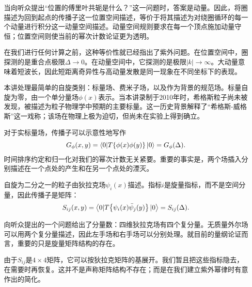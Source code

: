 当向听众提出``位置的傅里叶共轭是什么？''这一问题时，答案是动量。因此，将圈描述为回到起点的传播子这一位置空间描述，等价于将其描述为对绕圈循环的每一个动量进行积分这一动量空间描述。动量空间规则要求在每一个顶点施加动量守恒；位置空间则使当前的幂次计数论证更为透明。

在我们进行任何计算之前，这种等价性就已经指出了紫外问题。在位置空间中，圈探测的是重合点极限\(\Delta\to0\)。在动量空间中，它探测的是极限\(|k|\to\infty\)。大动量意味着短波长，因此短距离奇异性与高动量发散是同一现象在不同坐标下的表现。

本讲处理最简单的自旋类别：标量场、费米子场，以及作为背景的规范场。标量自旋为零，由一个单分量场\(\phi(x)\)表示。当本讲录制于2010年时，希格斯粒子尚未被发现，被描述为粒子物理学中预期的主要标量。这一历史背景解释了``希格斯-威格斯''这一戏称；该场在物理上极为迫切，但尚未在实验上得到确立。

对于实标量场，传播子可以示意性地写作
\begin{equation}
G_\phi(x,y)=\left\langle0|T\!\left\{\phi(x)\phi(y)\right\}|0\right\rangle
=G_\phi(\Delta).
\end{equation}
时间排序约定和归一化对我们的幂次计数无关紧要。重要的事实是，两个场插入分别描述在一个点处的产生和在另一个点处的湮灭。

\begin{classroomqa}
\end{classroomqa}

自旋为二分之一的粒子由狄拉克场\(\psi_i(x)\)描述。指标\(i\)是旋量指标，而不是空间分量，因此传播子是矩阵：
\begin{equation}
S_{ij}(x,y)=\left\langle0|T\!\left\{\psi_i(x)\bar\psi_j(y)\right\}|0\right\rangle
=S_{ij}(\Delta).
\end{equation}

向听众提出的一个问题给出了分量数：四维狄拉克场有四个复分量。无质量外尔场可以用两个复分量描述，因此左手场和右手场可以分别处理。就目前的量纲论证而言，重要的只是旋量矩阵结构的存在。

由于\(S_{ij}\)是\(4\times4\)矩阵，它可以按狄拉克矩阵的基展开。我们暂且把这些指标隐去，在需要时再恢复。这并不是声称矩阵结构不存在；而是在我们建立紫外幂律时有意作出的简化。

\begin{classroomqa}
\end{classroomqa}

